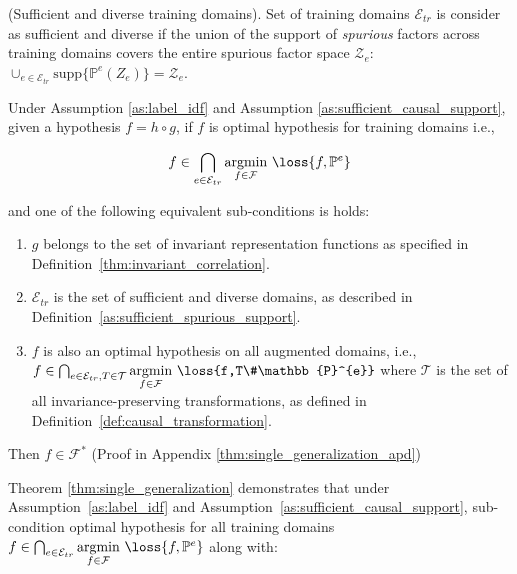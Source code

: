 \begin{definition} (Sufficient and diverse training domains). Set of training domains $\mathcal{E}_{tr}$ is consider as sufficient and diverse if  the union of the support of \textit{spurious} factors across training domains covers the entire spurious factor space $\mathcal{Z}_e$: $\cup_{e\in \mathcal{E}_{tr}}\text{supp}\{\mathbb{P}^{e} \left (Z_e \right )\}=\mathcal{Z}_e$. 
\label{as:sufficient_spurious_support}
\end{definition}

\begin{theorem} Under Assumption \ref{as:label_idf} and Assumption \ref{as:sufficient_causal_support}, given a hypothesis $f=h\circ g$, if $f$ is optimal hypothesis for training domains i.e.,

$$f\in \bigcap_{{e}\in \mathcal{E}_{tr}}\underset{f\in \mathcal{F}}{\text{argmin}} \ \loss{f,\mathbb{P}^{e}}$$

and one of the following equivalent sub-conditions is holds:
\begin{enumerate}
    \item $g$ belongs to the set of invariant representation functions as specified in Definition~\ref{thm:invariant_correlation}.
    
    \item $\mathcal{E}_{tr}$ is the set of sufficient and diverse domains, as described in Definition~\ref{as:sufficient_spurious_support}.
    
    \item $f$ is also an optimal hypothesis on all augmented domains, i.e., $f\in \bigcap_{{e}\in \mathcal{E}_{tr}, T\in \mathcal{T}}\underset{f\in \mathcal{F}}{\text{argmin}} \ \loss{f,T\#\mathbb{P}^{e}}$ where $\mathcal{T}$ is the set of all invariance-preserving transformations, as defined in Definition~\ref{def:causal_transformation}.
\end{enumerate}

Then $f\in \mathcal{F}^*$ (Proof in Appendix \ref{thm:single_generalization_apd})
\label{thm:single_generalization}
\end{theorem}




Theorem \ref{thm:single_generalization} demonstrates that under Assumption~\ref{as:label_idf} and Assumption~\ref{as:sufficient_causal_support},  
sub-condition optimal hypothesis for all training domains $f\in \bigcap_{{e}\in \mathcal{E}_{tr}}\underset{f\in \mathcal{F}}{\text{argmin}} \ \loss{f,\mathbb{P}^{e}}$ along with:

